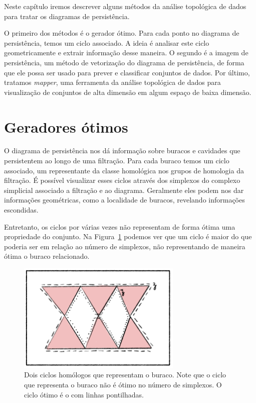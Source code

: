 Neste capítulo iremos descrever alguns métodos da análise topológica de dados
para tratar os diagramas de persistência. 

O primeiro dos métodos é o
gerador ótimo. Para cada ponto no diagrama de persistência, temos um ciclo
associado. A ideia é analisar este ciclo geometricamente e extrair 
informação desse maneira. 
O segundo é a imagem de persistência, um método de vetorização do diagrama de 
persistência, de forma que ele possa ser usado para prever e classificar 
conjuntos de dados. 
Por último, tratamos \textit{mapper}, uma ferramenta da análise topológica 
de dados para visualização de conjuntos de alta dimensão em algum 
espaço de baixa dimensão. 

\section{Geradores ótimos}
O diagrama de persistência nos dá informação sobre buracos e cavidades que
persistentem ao longo de uma filtração. Para cada buraco temos um ciclo
associado, um representante da classe homológica nos grupos de homologia 
da filtração. É possível visualizar esses ciclos através dos simplexos do
complexo simplicial associado a filtração e ao diagrama. Geralmente eles 
podem nos dar informações geométricas, como a localidade de buracos, 
revelando informações escondidas. 

Entretanto, os ciclos por várias vezes não representam de forma ótima
uma propriedade do conjunto. Na Figura~\ref{fig:nonoptcyc} podemos
ver que um ciclo é maior do que poderia ser em relação ao número
de simplexos, não representando de maneira ótima o buraco relacionado. 
\begin{figure}\label{fig:nonoptimal}
    \centering
    \includegraphics[width=0.7\textwidth]{images/nonoptcyc.png}
    \caption{Dois ciclos homólogos que representam o buraco. Note que o ciclo
            que representa o buraco não é ótimo no número de simplexos. O ciclo
            ótimo é o com linhas pontilhadas.}
    \label{fig:nonoptcyc}
    \fautor
\end{figure} 


